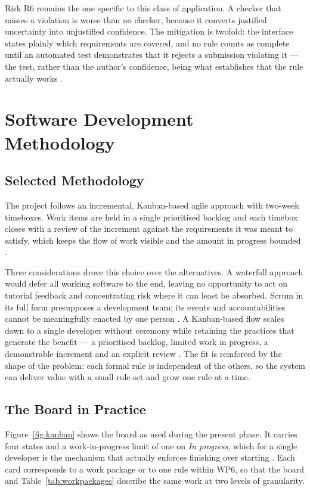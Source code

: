 \documentclass[a4paper,11pt]{article}
\begin{document}
Risk R6 remains the one specific to this class of application. A checker that
misses a violation is worse than no checker, because it converts justified
uncertainty into unjustified confidence. The mitigation is twofold: the
interface states plainly which requirements are covered, and no rule counts as
complete until an automated test demonstrates that it rejects a submission
violating it --- the test, rather than the author's confidence, being what
establishes that the rule actually works \citep{Khorikov2020}.

\section{Software Development Methodology}\label{sec:methodology}

\subsection{Selected Methodology}\label{subsec:selected}

The project follows an incremental, Kanban-based agile approach with two-week
timeboxes. Work items are held in a single prioritised backlog and each timebox
closes with a review of the increment against the requirements it was meant to
satisfy, which keeps the flow of work visible and the amount in progress bounded
\citep{Ambler2022}.

Three considerations drove this choice over the alternatives. A waterfall
approach would defer all working software to the end, leaving no opportunity to
act on tutorial feedback and concentrating risk where it can least be absorbed.
Scrum in its full form presupposes a development team; its events and
accountabilities cannot be meaningfully enacted by one person
\citep{Schwaber2020}. A Kanban-based flow scales down to a single developer
without ceremony while retaining the practices that generate the benefit ---
a prioritised backlog, limited work in progress, a demonstrable increment and an
explicit review \citep{Ambler2022}. The fit is reinforced by the shape of the
problem: each formal rule is independent of the others, so the system can
deliver value with a small rule set and grow one rule at a time.

\subsection{The Board in Practice}\label{subsec:board}

Figure~\ref{fig:kanban} shows the board as used during the present phase. It
carries four states and a work-in-progress limit of one on \textit{In progress},
which for a single developer is the mechanism that actually enforces finishing
over starting \citep{Ambler2022}. Each card corresponds to a work package or to
one rule within WP6, so that the board and Table~\ref{tab:workpackages} describe
the same work at two levels of granularity.
\end{document}
